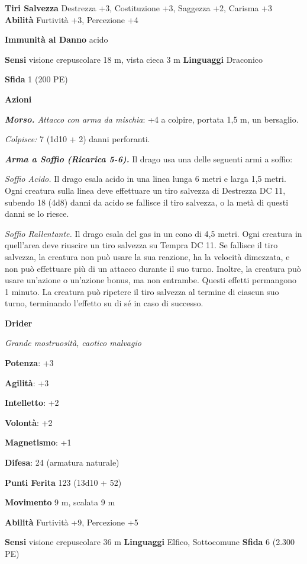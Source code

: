 \begin{multicols}{2}
\textbf{Tiri Salvezza} Destrezza +3, Costituzione +3, Saggezza +2,
Carisma +3 \textbf{Abilità} Furtività +3, Percezione +4

\textbf{Immunità al Danno} acido

\textbf{Sensi} visione crepuscolare 18 m, vista cieca 3 m
\textbf{Linguaggi} Draconico

\textbf{Sfida} 1 (200 PE)

\textbf{Azioni}

\emph{\textbf{Morso.} Attacco con arma da mischia}: +4 a colpire,
portata 1,5 m, un bersaglio.

\emph{Colpisce:} 7 (1d10 + 2) danni perforanti.

\emph{\textbf{Arma a Soffio (Ricarica 5-6).}} Il drago usa una delle
seguenti armi a soffio:

\emph{Soffio Acido.} Il drago esala acido in una linea lunga 6 metri e
larga 1,5 metri. Ogni creatura sulla linea deve effettuare un tiro
salvezza di Destrezza DC 11, subendo 18 (4d8) danni da acido se fallisce
il tiro salvezza, o la metà di questi danni se lo riesce.

\emph{Soffio Rallentante.} Il drago esala del gas in un cono di 4,5
metri. Ogni creatura in quell'area deve riuscire un tiro salvezza su Tempra DC 11. Se fallisce il tiro salvezza, la creatura non può
usare la sua reazione, ha la velocità dimezzata, e non può effettuare
più di un attacco durante il suo turno. Inoltre, la creatura può usare
un'azione o un'azione bonus, ma non entrambe. Questi effetti permangono
1 minuto. La creatura può ripetere il tiro salvezza al termine di
ciascun suo turno, terminando l'effetto su di sé in caso di successo.



\textbf{Drider}

\emph{Grande mostruosità, caotico malvagio}

\textbf{Potenza}: +3

\textbf{Agilità}: +3

\textbf{Intelletto}: +2

\textbf{Volontà}: +2

\textbf{Magnetismo}: +1

\textbf{Difesa}: 24 (armatura naturale)

\textbf{Punti Ferita} 123 (13d10 + 52)

\textbf{Movimento} 9 m, scalata 9 m

\textbf{Abilità} Furtività +9, Percezione +5

\textbf{Sensi} visione crepuscolare 36 m
\textbf{Linguaggi} Elfico, Sottocomune \textbf{Sfida} 6 (2.300 PE)


\end{multicols}
